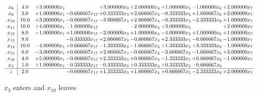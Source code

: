 \documentclass[10pt]{article}
\begin{document}
 \[\begin{array}{c| c c@{\hskip 2pt} c@{\hskip 2pt} c@{\hskip 2pt} c@{\hskip 2pt} c@{\hskip 2pt} c@{\hskip 2pt} c@{\hskip 2pt} }
 x_{8}   &  4.0 & + 3.000000 x_{1} &   & + 3.000000 x_{3} & + 2.000000 x_{4} & + 1.000000 x_{5} & -1.000000 x_{6} & + 2.000000 x_{7}\\
 x_{9}   &  3.0 & + 1.000000 x_{1} & -0.666667 x_{17} & + 0.333333 x_{3} & + 2.666667 x_{4} & -0.333333 x_{5} & + 1.666667 x_{6} & + 2.000000 x_{7}\\
 x_{10}   &  10.0 & + 3.000000 x_{1} & -0.666667 x_{17} & -3.666667 x_{3} & + 2.666667 x_{4} & -0.333333 x_{5} & -2.333333 x_{6} & + 1.000000 x_{7}\\
 x_{11}   &  10.0 & + 4.000000 x_{1} & -1.000000 x_{17} &   & -2.000000 x_{4} & + 3.000000 x_{5} &   & + 2.000000 x_{7}\\
 x_{12}   &  8.0 & -1.000000 x_{1} & + 1.000000 x_{17} & -2.000000 x_{3} & + 1.000000 x_{4} & -4.000000 x_{5} & + 1.000000 x_{6} & + 1.000000 x_{7}\\
 x_{13}   &  8.0  &   & -0.333333 x_{17} & + 2.666667 x_{3} & -0.666667 x_{4} & + 2.333333 x_{5} & -0.666667 x_{6} & -1.000000 x_{7}\\
 x_{14}   &  10.0 & -4.000000 x_{1} & + 0.666667 x_{17} & -1.333333 x_{3} & -1.666667 x_{4} & + 1.333333 x_{5} & + 3.333333 x_{6} & -1.000000 x_{7}\\
 x_{15}   &  6.0 & -3.000000 x_{1} & + 0.666667 x_{17} & + 2.666667 x_{3} & -0.666667 x_{4} & -3.666667 x_{5} & -1.666667 x_{6} & + 3.000000 x_{7}\\
 x_{16}   &  4.0 & + 5.000000 x_{1} & -0.666667 x_{17} & + 2.333333 x_{3} & + 0.666667 x_{4} & -1.333333 x_{5} & + 0.666667 x_{6} & -1.000000 x_{7}\\
 x_{2}   &  1.0 & + 1.000000 x_{1} & -0.333333 x_{17} & -0.333333 x_{3} & + 0.333333 x_{4} & + 0.333333 x_{5} & -0.666667 x_{6} &   \\
\hline
z    &  2.0  &   & -0.666667 x_{17} & + 1.333333 x_{3} & + 1.666667 x_{4} & + 0.666667 x_{5} & -2.333333 x_{6} & + 2.000000 x_{7}\\
\end{array}\]


 $ x_{3} $ enters and $ x_{10} $ leaves 
\end{document}
